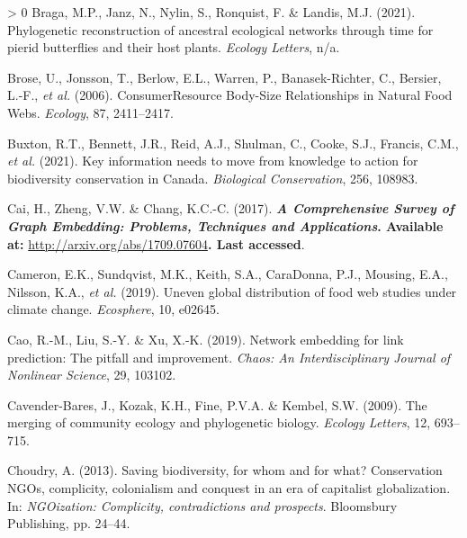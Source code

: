 \documentclass[11pt]{article}
\makeatletter
\def\maxwidth{\ifdim\Gin@nat@width>\linewidth\linewidth
\else\Gin@nat@width\fi}
\let\Oldincludegraphics\includegraphics
\renewcommand{\includegraphics}[1]{\Oldincludegraphics[width=\maxwidth]{#1}}
\newlength{\cslhangindent}
\newenvironment{CSLReferences}[3] %
 {%
  \setlength{\parindent}{0pt}
  \ifodd #1 \everypar{\setlength{\hangindent}{\cslhangindent}}\ignorespaces\fi
  \ifnum #2 > 0
  \setlength{\parskip}{#2\baselineskip}
  \fi
 }%
 {}
\providecommand{\DIFaddtex}[1]{{\bf #1}} %
\providecommand{\DIFdeltex}[1]{} %
\providecommand{\DIFaddbegin}{\protect\color{blue}} %
\providecommand{\DIFaddend}{\protect\color{black}} %
\providecommand{\DIFdelbegin}{\protect\color{red}} %
\providecommand{\DIFdelend}{\protect\color{black}} %
\providecommand{\DIFadd}[1]{\texorpdfstring{\DIFaddtex{#1}}{#1}} %
\providecommand{\DIFdel}[1]{\texorpdfstring{\DIFdeltex{#1}}{}} %
\newcommand{\DIFscaledelfig}{0.5}
\newlength{\DIFdelgraphicswidth} %
\newlength{\DIFdelgraphicsheight} %
\newcommand{\DIFaddincludegraphics}[2][]{{\color{blue}\fbox{\DIFOincludegraphics[#1]{#2}}}} %
\newcommand{\DIFdelincludegraphics}[2][]{%
\sbox{\DIFdelgraphicsbox}{\DIFOincludegraphics[#1]{#2}}%
\settoboxwidth{\DIFdelgraphicswidth}{\DIFdelgraphicsbox} %
\settoboxtotalheight{\DIFdelgraphicsheight}{\DIFdelgraphicsbox} %
\scalebox{\DIFscaledelfig}{%
\parbox[b]{\DIFdelgraphicswidth}{\usebox{\DIFdelgraphicsbox}\\[-\baselineskip] \rule{\DIFdelgraphicswidth}{0em}}\llap{\resizebox{\DIFdelgraphicswidth}{\DIFdelgraphicsheight}{%
\setlength{\unitlength}{\DIFdelgraphicswidth}%
\begin{picture}(1,1)%
\thicklines\linethickness{2pt} %
{\color[rgb]{1,0,0}\put(0,0){\framebox(1,1){}}}%
{\color[rgb]{1,0,0}\put(0,0){\line( 1,1){1}}}%
{\color[rgb]{1,0,0}\put(0,1){\line(1,-1){1}}}%
\end{picture}%
}\hspace*{3pt}}} %
} %
\DeclareRobustCommand{\DIFaddbegin}{\DIFOaddbegin \let\includegraphics\DIFaddincludegraphics} %
\DeclareRobustCommand{\DIFaddend}{\DIFOaddend \let\includegraphics\DIFOincludegraphics} %
\DeclareRobustCommand{\DIFdelbegin}{\DIFOdelbegin \let\includegraphics\DIFdelincludegraphics} %
\DeclareRobustCommand{\DIFdelend}{\DIFOaddend \let\includegraphics\DIFOincludegraphics} %
\makeatother
\begin{document}
\begin{CSLReferences}{1}{0}
\leavevmode\hypertarget{ref-Braga2021PhyRec}{}%
Braga, M.P., Janz, N., Nylin, S., Ronquist, F. \& Landis, M.J. (2021).
Phylogenetic reconstruction of ancestral ecological networks through
time for pierid butterflies and their host plants. \emph{Ecology
Letters}, n/a.

\leavevmode\hypertarget{ref-Brose2006ConRes}{}%
Brose, U., Jonsson, T., Berlow, E.L., Warren, P., Banasek-Richter, C.,
Bersier, L.-F., \emph{et al.} (2006). ConsumerResource Body-Size
Relationships in Natural Food Webs. \emph{Ecology}, 87, 2411--2417.

\leavevmode\hypertarget{ref-Buxton2021KeyInf}{}%
Buxton, R.T., Bennett, J.R., Reid, A.J., Shulman, C., Cooke, S.J.,
Francis, C.M., \emph{et al.} (2021). Key information needs to move from
knowledge to action for biodiversity conservation in Canada.
\emph{Biological Conservation}, 256, 108983.

\leavevmode\hypertarget{ref-Cai2017ComSur}{}%
Cai, H., Zheng, V.W. \& Chang, K.C.-C. (2017). \DIFdelbegin \DIFdel{A Comprehensive Survey of
Graph Embedding: Problems, Techniques and Applications. \emph{arXiv
preprint arXiv:1709.07604}}\DIFdelend \DIFaddbegin \DIFadd{\emph{A Comprehensive
Survey of Graph Embedding: Problems, Techniques and Applications}.
Available at: }\url{http://arxiv.org/abs/1709.07604}\DIFadd{. Last accessed}\DIFaddend .

\leavevmode\hypertarget{ref-Cameron2019UneGlo}{}%
Cameron, E.K., Sundqvist, M.K., Keith, S.A., CaraDonna, P.J., Mousing,
E.A., Nilsson, K.A., \emph{et al.} (2019). Uneven global distribution of
food web studies under climate change. \emph{Ecosphere}, 10, e02645.

\leavevmode\hypertarget{ref-Cao2019NetEmb}{}%
Cao, R.-M., Liu, S.-Y. \& Xu, X.-K. (2019). Network embedding for link
prediction: The pitfall and improvement. \emph{Chaos: An
Interdisciplinary Journal of Nonlinear Science}, 29, 103102.

\leavevmode\hypertarget{ref-Cavender-Bares2009MerCom}{}%
Cavender-Bares, J., Kozak, K.H., Fine, P.V.A. \& Kembel, S.W. (2009).
The merging of community ecology and phylogenetic biology. \emph{Ecology
Letters}, 12, 693--715.

\leavevmode\hypertarget{ref-Choudry2013SavBio}{}%
Choudry, A. (2013). Saving biodiversity, for whom and for what?
Conservation NGOs, complicity, colonialism and conquest in an era of
capitalist globalization. In: \emph{NGOization: Complicity,
contradictions and prospects}. Bloomsbury Publishing, pp. 24--44.


\end{CSLReferences}
\end{document}
